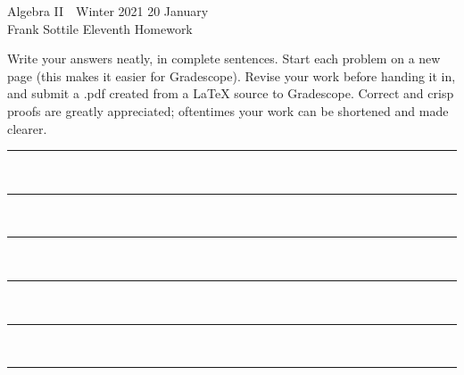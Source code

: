 \documentclass[12pt]{article}
\newcommand{\barsl}{\noindent\begin{minipage}[t]{575pt}
{\color{violet}\rule{575pt}{1.2pt}}\vspace{-5.7mm}\\
{\color{blue}\rule{575pt}{1.2pt}}\vspace{-5.7mm}\\
{\color{green}\rule{575pt}{1.2pt}}\vspace{-5.7mm}\\
{\color{yellow}\rule{575pt}{1.2pt}}\vspace{-5.7mm}\\
{\color{orange}\rule{575pt}{1.2pt}}\vspace{-5.7mm}\\
{\color{red}\rule{575pt}{1.2pt}}
\end{minipage}}
\begin{document}
\LARGE 
\noindent
Algebra II\ \ Winter 2021 \hfill 20 January\makebox[40pt][l]{\ }\\
Frank Sottile \hfill
\Large\sf
Eleventh Homework\makebox[40pt][l]{\ }\\
\large\vspace{5pt}


\noindent
Write your answers neatly, in complete sentences.
Start each problem on a new page (this makes it easier for Gradescope).
Revise your work before handing it in, and submit a .pdf  created from a LaTeX source to Gradescope.
Correct and crisp proofs are greatly appreciated; oftentimes your work can be shortened and made clearer.\newline
\vspace{-5pt}

\barsl
\end{document}
